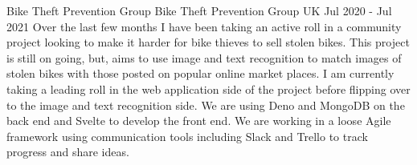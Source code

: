     \cventry
        {Bike Theft Prevention Group}
        {Bike Theft Prevention Group}
        {UK}
        {Jul 2020 - Jul 2021}
        {
            Over the last few months I have been taking an active roll in a 
            community project looking to make it harder for bike thieves to 
            sell stolen bikes. This project is still on going, but, aims to 
            use image and text recognition to match images of stolen bikes 
            with those posted on popular online market places. I am currently 
            taking a leading roll in the web application side of the project 
            before flipping over to the image and text recognition side. We 
            are using Deno and MongoDB on the back end and Svelte to develop 
            the front end. We are working in a loose Agile framework using 
            communication tools including Slack and Trello to track progress 
            and share ideas.\newline 
        }
